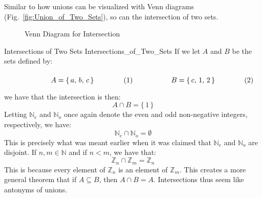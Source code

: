         Similar to how unions can be visualized with Venn diagrams
        (Fig.~\ref{fig:Union_of_Two_Sets}), so can the intersection of
        two sets.
        \begin{figure}[H]
            \centering
            
            \caption{Venn Diagram for Intersection}
            \label{fig:Intersection_of_Two_Sets}
        \end{figure}
        \begin{fexample}{Intersections of Two Sets}
                        {Intersections_of_Two_Sets}
            If we let $A$ and $B$ be the sets defined by:
            \par\hfill\par
            \begin{subequations}
                \begin{minipage}[b]{0.49\textwidth}
                    \begin{equation}
                        A=\{\,a,\,b,\,c\,\}
                    \end{equation}
                \end{minipage}
                \hfill
                \begin{minipage}[b]{0.49\textwidth}
                    \begin{equation}
                        B=\{\,c,\,1,\,2\,\}
                    \end{equation}
                \end{minipage}
            \end{subequations}
            \par\vspace{2.5ex}
            we have that the intersection is then:
            \begin{equation}
                A\cap{B}=\{\,1\,\}
            \end{equation}
            Letting $\mathbb{N}_{e}$ and $\mathbb{N}_{o}$ once again denote
            the even and odd non-negative integers, respectively, we have:
            \begin{equation}
                \mathbb{N}_{e}\cap\mathbb{N}_{o}=\emptyset
            \end{equation}
            This is precisely what was meant earlier when it was claimed that
            $\mathbb{N}_{e}$ and $\mathbb{N}_{o}$ are disjoint. If
            $n,m\in\mathbb{N}$ and if $n<m$, we have that:
            \begin{equation}
                \mathbb{Z}_{n}\cap\mathbb{Z}_{m}=\mathbb{Z}_{n}
            \end{equation}
            This is because every element of $\mathbb{Z}_{n}$ is an element
            of $\mathbb{Z}_{m}$. This creates a more general theorem that if
            $A\subseteq{B}$, then $A\cap{B}=A$. Intersections thus seem like
            antonyms of unions.
        \end{fexample}
